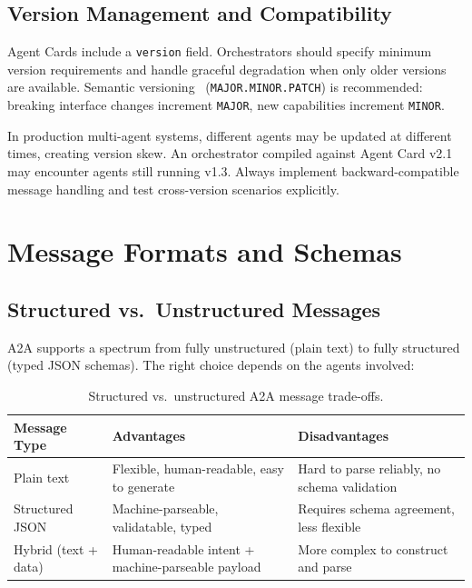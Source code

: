 \subsection{Version Management and Compatibility}
\label{version-management-and-compatibility}

Agent Cards include a \texttt{version} field. Orchestrators should specify minimum version requirements and handle graceful degradation when only older versions are available. Semantic versioning~\cite{preston2024semver} (\texttt{MAJOR.MINOR.PATCH}) is recommended: breaking interface changes increment \texttt{MAJOR}, new capabilities increment \texttt{MINOR}.

\begin{warningbox}
In production multi-agent systems, different agents may be updated at different times, creating version skew. An orchestrator compiled against Agent Card v2.1 may encounter agents still running v1.3. Always implement backward-compatible message handling and test cross-version scenarios explicitly.
\end{warningbox}

\section{Message Formats and Schemas}
\label{sec:a2a:messages}

\subsection{Structured vs.~Unstructured Messages}
\label{structured-vs.-unstructured-messages}

A2A supports a spectrum from fully unstructured (plain text) to fully structured (typed JSON schemas). The right choice depends on the agents involved:

\begin{table}[ht!]
\centering
\caption{Structured vs.~unstructured A2A message trade-offs.}
\begin{tabular}{@{}lp{5cm}p{8cm}@{}}
\toprule
\textbf{Message Type} & \textbf{Advantages} & \textbf{Disadvantages} \\
\midrule
Plain text & Flexible, human-readable, easy to generate & Hard to parse reliably, no schema validation \\
Structured JSON & Machine-parseable, validatable, typed & Requires schema agreement, less flexible \\
Hybrid (text + data) & Human-readable intent + machine-parseable payload & More complex to construct and parse \\
\bottomrule
\end{tabular}
\end{table}


